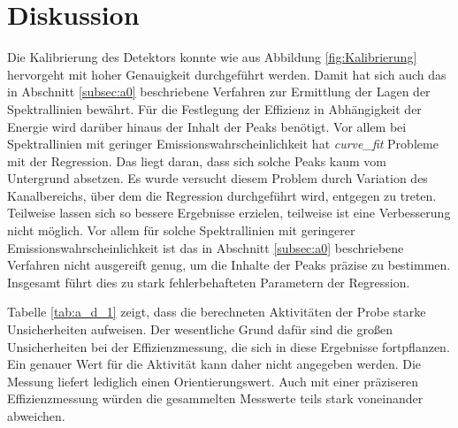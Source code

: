 \section{Diskussion}
\label{sec:Diskussion}
Die Kalibrierung des Detektors konnte wie aus Abbildung \ref{fig:Kalibrierung} hervorgeht mit hoher Genauigkeit durchgeführt werden.
Damit hat sich auch das in Abschnitt \ref{subsec:a0} beschriebene Verfahren zur Ermittlung der Lagen der Spektrallinien bewährt.
Für die Festlegung der Effizienz in Abhängigkeit der Energie wird darüber hinaus der Inhalt der Peaks benötigt.
Vor allem bei Spektrallinien mit geringer Emissionswahrscheinlichkeit hat \textit{curve\_fit} Probleme mit der Regression. 
Das liegt daran, dass sich solche Peaks kaum vom Untergrund absetzen.
Es wurde versucht diesem Problem durch Variation des Kanalbereichs, über dem die Regression durchgeführt wird, entgegen zu treten.
Teilweise lassen sich so bessere Ergebnisse erzielen, teilweise ist eine Verbesserung nicht möglich.
Vor allem für solche Spektrallinien mit geringerer Emissionswahrscheinlichkeit ist das in Abschnitt \ref{subsec:a0} beschriebene Verfahren nicht ausgereift genug, um die Inhalte der Peaks präzise zu bestimmen.
Insgesamt führt dies zu stark fehlerbehafteten Parametern der Regression.

Tabelle \ref{tab:a_d_1} zeigt, dass die berechneten Aktivitäten der Probe starke Unsicherheiten aufweisen.
Der wesentliche Grund dafür sind die großen Unsicherheiten bei der Effizienzmessung, die sich in diese Ergebnisse fortpflanzen.
Ein genauer Wert für die Aktivität kann daher nicht angegeben werden. 
Die Messung liefert lediglich einen Orientierungswert.
Auch mit einer präziseren Effizienzmessung würden die gesammelten Messwerte teils stark voneinander abweichen.
